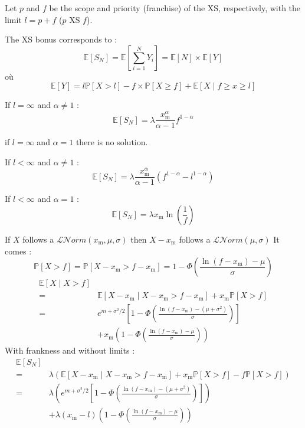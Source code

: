 \begin{f}
Let $p$ and $f$ be the scope and priority (franchise) of the XS, respectively, with the limit $l=p+f$ ($p$ XS $f$).

The XS bonus corresponds to :
$$
\mathbb{E}\left[S_N\right]=\mathbb{E}\left[\sum_{i=1}^{N} Y_{i}\right]=\mathbb{E}[N]\times \mathbb{E}[Y]
$$
où
$$
\mathbb{E}[Y]= l \mathbb{P}[X>l] - f \times \mathbb{P}[X\geq f] + \mathbb{E}[X\mid f\geq x\geq l]
$$


If $l=\infty$ and $\alpha \neq 1$ :
$$
\mathbb{E}[S_N] = \lambda \frac{x_\mathrm{m}^{\alpha}}{\alpha -1}f^{1-\alpha} 
$$

if  $l=\infty$ and $\alpha = 1$ there is no solution.

If $l<\infty$ and $\alpha \neq 1$ :
$$
\mathbb{E}[S_N] = \lambda \frac{x_\mathrm{m}^{\alpha}}{\alpha -1}\left( f^{1-\alpha} -l^{1-\alpha} \right)
$$

If $l<\infty$ and $\alpha = 1$ :
$$
\mathbb{E}[S_N] = \lambda x_\mathrm{m} \ln \left(  \frac{1}{f}\right)
$$
\end{f}



\begin{f}

If $X$ follows a $\mathcal{L}\mathcal{N}orm(x_\mathrm{m}, \mu, \sigma)$ then $X-x_\mathrm{m}$ follows a $\mathcal{L}\mathcal{N}orm(\mu, \sigma)$
It comes :
$$
\mathbb{P}[X>f]=\mathbb{P}[X-x_\mathrm{m}>f-x_\mathrm{m}]=1-\Phi\left(\frac{\ln(f-x_\mathrm{m})-\mu}{\sigma}\right)
$$
\begin{align*}
	\mathbb{E}[X\mid X>f] \\ 
	= & \mathbb{E}\left[ X-x_\mathrm{m}\mid X-x_\mathrm{m}>f-x_\mathrm{m} \right]+x_\mathrm{m} \mathbb{P}[X>f]\\
	= & e ^{m+\sigma^2/2} \left[1-\Phi\left(\frac{\ln(f-x_\mathrm{m})-(\mu+\sigma^2)}{\sigma}\right) \right]\\
	& +x_\mathrm{m} \left( 1-\Phi\left(\frac{\ln(f-x_\mathrm{m})-\mu}{\sigma}\right) \right)
\end{align*}
With frankness and without limits :
\begin{align*}
	\mathbb{E}[S_N] \\ 
	= & \lambda \left(\mathbb{E}\left[ X-x_\mathrm{m}\mid X-x_\mathrm{m}>f-x_\mathrm{m} \right]+x_\mathrm{m} \mathbb{P}[X>f]-f\mathbb{P}[X>f]\right)\\
	= & \lambda \left(  e ^{m+\sigma^2/2} \left[1-\Phi\left(\frac{\ln(f-x_\mathrm{m})-(\mu+\sigma^2)}{\sigma}\right) \right]\right)\\
	& +\lambda (x_\mathrm{m}-l) \left( 1-\Phi\left(\frac{\ln(f-x_\mathrm{m})-\mu}{\sigma}\right) \right)
\end{align*}

\end{f}